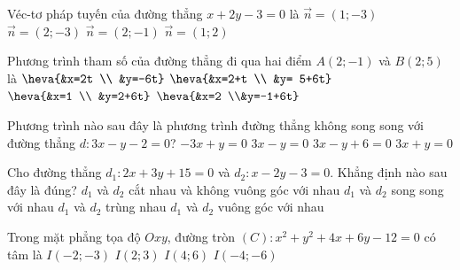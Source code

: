 \begin{ex}%
	Véc-tơ pháp tuyến của đường thẳng $x+2y-3=0$ là
	\choice
	{$\overrightarrow{n}=(1;-3)$}
	{$\overrightarrow{n}=(2;-3)$}
	{$\overrightarrow{n}=(2;-1)$}
	{\True $\overrightarrow{n}=(1;2)$}
\end{ex}

\begin{ex}%
	Phương trình tham số của đường thẳng đi qua hai điểm $A(2;-1)$ và $B(2;5)$ là
	\choice
	{$\heva{&x=2t \\ &y=-6t}$}
	{$\heva{&x=2+t \\ &y= 5+6t}$}
	{$\heva{&x=1 \\ &y=2+6t}$}
	{\True $\heva{&x=2 \\&y=-1+6t}$}
\end{ex}

\begin{ex}%
	Phương trình nào sau đây là phương trình đường thẳng không song song với đường thẳng $d \colon 3x-y-2=0$?
	\choice
	{$-3x+y=0$}
	{$3x-y=0$}
	{$3x-y+6=0$}
	{$3x+y=0$}
\end{ex}

\begin{ex}%
	Cho đường thẳng $d_1 \colon 2x+3y+15=0$ và $d_2 \colon x-2y-3=0$. Khẳng định nào sau đây là đúng?
	\choice
	{\True $d_1$ và $d_2$ cắt nhau và không vuông góc với nhau}
	{$d_1$ và $d_2$ song song với nhau}
	{$d_1$ và $d_2$ trùng nhau}
	{$d_1$ và $d_2$ vuông góc với nhau}
\end{ex}

\begin{ex}%
	Trong mặt phẳng tọa độ $Oxy$, đường tròn $(C) \colon x^2+y^2+4x+6y-12=0$ có tâm là
	\choice
	{\True $I(-2;-3)$}
	{$I(2;3)$}
	{$I(4;6)$}
	{$I(-4;-6)$}
\end{ex}

